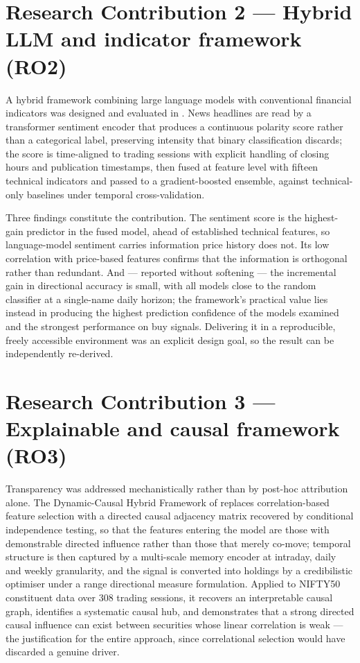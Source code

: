 \section{Research Contribution 2 --- Hybrid LLM and indicator framework (RO2)}

A hybrid framework combining large language models with conventional financial indicators
was designed and evaluated in . News headlines are read by a transformer
sentiment encoder that produces a continuous polarity score rather than a categorical
label, preserving intensity that binary classification discards; the score is time-aligned
to trading sessions with explicit handling of closing hours and publication timestamps,
then fused at feature level with fifteen technical indicators and passed to a
gradient-boosted ensemble, against technical-only baselines under temporal
cross-validation.

Three findings constitute the contribution. The sentiment score is the highest-gain
predictor in the fused model, ahead of established technical features, so language-model
sentiment carries information price history does not. Its low correlation with price-based
features confirms that the information is orthogonal rather than redundant. And ---
reported without softening --- the incremental gain in directional accuracy is small, with
all models close to the random classifier at a single-name daily horizon; the framework's
practical value lies instead in producing the highest prediction confidence of the models
examined and the strongest performance on buy signals. Delivering it in a reproducible,
freely accessible environment was an explicit design goal, so the result can be
independently re-derived.

\section{Research Contribution 3 --- Explainable and causal framework (RO3)}

Transparency was addressed mechanistically rather than by post-hoc attribution alone. The
Dynamic-Causal Hybrid Framework of  replaces correlation-based feature
selection with a directed causal adjacency matrix recovered by conditional independence
testing, so that the features entering the model are those with demonstrable directed
influence rather than those that merely co-move; temporal structure is then captured by a
multi-scale memory encoder at intraday, daily and weekly granularity, and the signal is
converted into holdings by a credibilistic optimiser under a range directional measure
formulation. Applied to NIFTY50 constituent data over 308 trading sessions, it recovers an
interpretable causal graph, identifies a systematic causal hub, and demonstrates that a
strong directed causal influence can exist between securities whose linear correlation is
weak --- the justification for the entire approach, since correlational selection would
have discarded a genuine driver.

